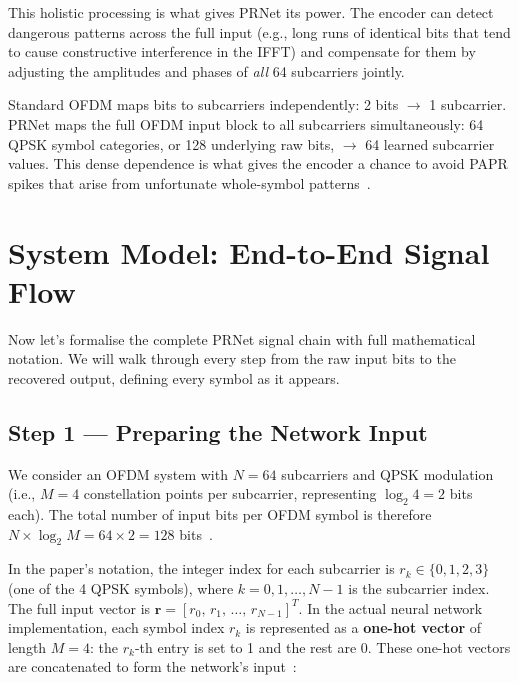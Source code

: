 This holistic processing is what gives PRNet its power.  The encoder can
detect dangerous patterns across the full input (e.g., long runs of identical
bits that tend to cause constructive interference in the IFFT) and compensate
for them by adjusting the amplitudes and phases of \emph{all} 64 subcarriers
jointly.

\begin{keyinsight}
    Standard OFDM maps bits to subcarriers independently: 2 bits $\to$
    1 subcarrier.  PRNet maps the full OFDM input block to all subcarriers
    simultaneously: 64 QPSK symbol categories, or 128 underlying raw bits,
    $\to$ 64 learned subcarrier values.  This dense dependence is what gives
    the encoder a chance to avoid PAPR spikes that arise from unfortunate
    whole-symbol patterns~\cite{kim2017novel}.
\end{keyinsight}


\section{System Model: End-to-End Signal Flow}
\label{sec:prnet_system_model}

Now let's formalise the complete PRNet signal chain with full mathematical
notation.  We will walk through every step from the raw input bits to the
recovered output, defining every symbol as it appears.


\subsection{Step 1 --- Preparing the Network Input}

We consider an OFDM system with $N = 64$ subcarriers and QPSK modulation
(i.e., $M = 4$ constellation points per subcarrier, representing $\log_2 4 = 2$
bits each).  The total number of input bits per OFDM symbol is therefore
$N \times \log_2 M = 64 \times 2 = 128$ bits~\cite{kim2017novel}.

In the paper's notation, the integer index for each subcarrier is
$r_k \in \{0, 1, 2, 3\}$ (one of the 4 QPSK symbols), where
$k = 0, 1, \dots, N-1$ is the subcarrier index.  The full input vector
is $\bm{r} = [r_0,\, r_1,\, \dots,\, r_{N-1}]^T$.  In the actual neural
network implementation, each symbol index $r_k$ is represented as a
\textbf{one-hot vector} of length $M = 4$: the $r_k$-th entry is set to 1
and the rest are 0.  These one-hot vectors are concatenated to form the
network's input~\cite{kim2017novel}:

